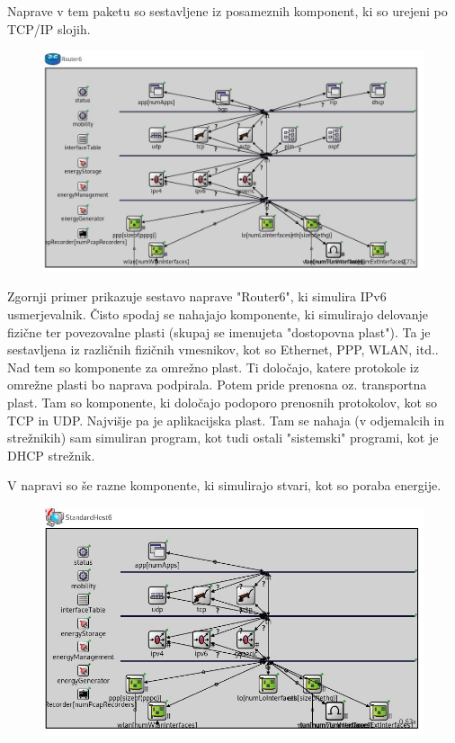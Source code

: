\documentclass[11pt,a4paper,slovene]{myarticle}
\begin{document}
Naprave v tem paketu so sestavljene iz posameznih komponent, ki so urejeni po TCP/IP slojih.

\begin{figure}[h]
  \includegraphics[width=\linewidth]{router6.jpg}
\end{figure}

Zgornji primer prikazuje sestavo naprave "Router6", ki simulira IPv6 usmerjevalnik.
Čisto spodaj se nahajajo komponente, ki simulirajo delovanje fizične ter povezovalne plasti (skupaj se imenujeta "dostopovna plast"). Ta je sestavljena iz različnih fizičnih vmesnikov, kot so Ethernet, PPP, WLAN, itd..
Nad tem so komponente za omrežno plast. Ti določajo, katere protokole iz omrežne plasti bo naprava podpirala.
Potem pride prenosna oz. transportna plast. Tam so komponente, ki določajo podoporo prenosnih protokolov, kot so TCP in UDP.
Najvišje pa je aplikacijska plast. Tam se nahaja (v odjemalcih in strežnikih) sam simuliran program, kot tudi ostali "sistemski" programi, kot je DHCP strežnik.

V napravi so še razne komponente, ki simulirajo stvari, kot so poraba energije.

\begin{figure}[h]
  \includegraphics[width=\linewidth]{standardhost6.jpg}
\end{figure}
\end{document}
